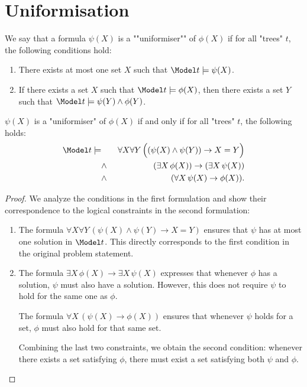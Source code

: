 \documentclass{article}
\begin{document}
\section{Uniformisation}

\begin{definition}[Uniformiser]
	We say that a formula $\psi(X)$ is a ""uniformiser"" of $\phi(X)$ if for all "trees" $t$, the following conditions hold:
	\begin{enumerate}
		\item There exists at most one set $X$ such that $\Model t \models \psi(X)$.
		\item If there exists a set $X$ such that $\Model t \models \phi(X)$, then there exists a set $Y$ such that $\Model t \models \psi(Y) \land \phi(Y)$.
	\end{enumerate}
\end{definition}

\begin{lemma}
	$\psi(X)$ is a "uniformiser" of $\phi(X)$ if and only if for all "trees" $t$, the following holds:
	\begin{eqnarray*}
		\Model t \models &\quad &  \forall X \forall Y \, \Big((\psi(X) \land \psi(Y)) \rightarrow X = Y\Big) \\
		& \land & (\exists X \, \phi(X)) \rightarrow (\exists X \, \psi(X)) \\
		& \land& (\forall X \, \psi(X) \rightarrow \phi(X)).
	\end{eqnarray*}
\end{lemma}

\begin{proof}
	We analyze the conditions in the first formulation and show their correspondence to the logical constraints in the second formulation:

	\begin{enumerate}
		\item The formula $\forall X \forall Y \, (\psi(X) \land \psi(Y) \rightarrow X = Y)$ ensures that $\psi$ has at most one solution
		      in $\Model t$. This directly corresponds to the first condition in the original problem statement.

		\item The formula $\exists X \, \phi(X) \rightarrow \exists X \, \psi(X)$ expresses that whenever $\phi$ has a solution, $\psi$ must also have a solution.
		      However, this does not require $\psi$ to hold for the same one as $\phi$.

		      The formula $\forall X \, (\psi(X) \rightarrow \phi(X))$ ensures that whenever $\psi$ holds for a set, $\phi$ must also hold for that same set.

		      Combining the last two constraints, we obtain the second condition: whenever there exists a set satisfying $\phi$, there must exist a set
		      satisfying both $\psi$ and $\phi$.
	\end{enumerate}
\end{proof}
\end{document}

